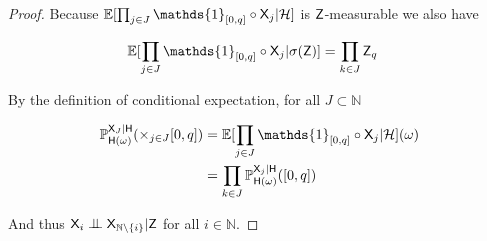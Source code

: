 \begin{proof}
Because $\mathbb{E}[\prod_{j\in J} \mathds{1}_{[0,q]}\circ \RV{X}_j|\sigalg{H}]$ is $\mathsf{Z}$-measurable we also have

\begin{align}
    \mathbb{E}[\prod_{j\in J} \mathds{1}_{[0,q]}\circ \RV{X}_j|\sigma(\RV{Z})] &= \prod_{k\in J} \RV{Z}_q
\end{align}

By the definition of conditional expectation, for all $J\subset \mathbb{N}$

\begin{align}
    \prob{P}_{\RV{H}(\omega)}^{\RV{X}_J|\RV{H}}(\times_{j\in J}[0,q]) &= \mathbb{E}[\prod_{j\in J} \mathds{1}_{[0,q]}\circ \RV{X}_j|\sigalg{H}](\omega)\\
                                                                      &= \prod_{k\in J} \prob{P}_{\RV{H}(\omega)}^{\RV{X}_j|\RV{H}}([0,q])
\end{align}

And thus $\RV{X}_i\CI\RV{X}_{\mathbb{N}\setminus\{i\}}|\RV{Z}$ for all $i\in\mathbb{N}$.
\end{proof}

